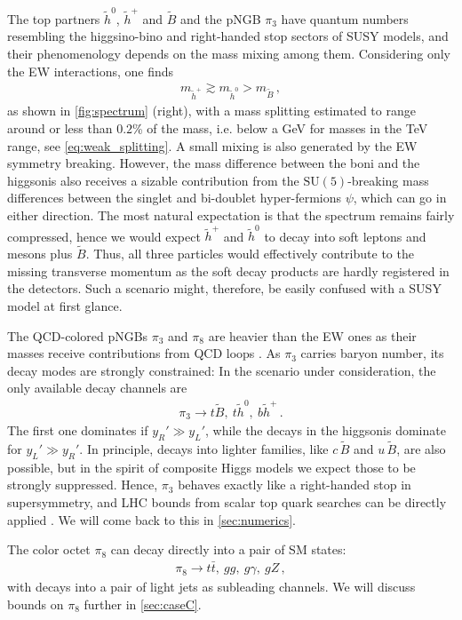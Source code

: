 \documentclass[preprintnumbers,nofootinbib,showpacs,eqsecnum,pre,12pt]{revtex4-1}
\newcommand{\SU}{\text{SU}}
\begin{document}
The top partners $\tilde h^0$, $\tilde h^+$ and $\tilde B$ and the pNGB $\pi_3$ have quantum numbers resembling the higgsino-bino and right-handed stop sectors of SUSY models, and their phenomenology depends on the mass mixing among them.
Considering only the EW interactions, one finds
\begin{align}
m_{\tilde h^+} \gtrsim m_{\tilde h^0} >  m_{\tilde B}\,, 
\end{align}
as shown in \cref{fig:spectrum} (right), with a mass splitting estimated to range around or less than $0.2$\% of the mass, i.e. below a GeV for masses in the TeV range, see \cref{eq:weak_splitting}.  A small mixing is also generated by the EW symmetry breaking. However, the mass difference between the boni and the higgsonis also receives a sizable contribution from the $\SU(5)$-breaking mass differences between the singlet and bi-doublet hyper-fermions $\psi$, which can go in either direction. The most natural expectation is that the spectrum remains fairly compressed, hence
we would expect $\tilde h^+$ and $\tilde h^0$ to decay into soft leptons and mesons plus $\tilde B$.
Thus, all three particles would effectively contribute to the missing transverse momentum as
the soft decay products are hardly registered in the detectors. Such a scenario
might, therefore, be easily confused with a SUSY model at first glance. 

The QCD-colored pNGBs $\pi_3$ and $\pi_8$ are heavier than the EW ones as their masses receive contributions from QCD loops \cite{Cacciapaglia:2015eqa}. As $\pi_3$ carries baryon number, its decay modes are strongly constrained: In the scenario under consideration, the only available decay channels are
\begin{align} \label{eq:pi3decayA}
\pi_3 \to t  \tilde B,\ t \tilde{h}^0,\ b \tilde{h}^+\,.
\end{align}
The first one dominates if $y_R' \gg y_L'$, while the decays in the higgsonis dominate for $y_L' \gg y_R'$.
In principle, decays into lighter families, like $c \, \tilde B$ and $u \, \tilde B$, are also possible, but in the spirit of composite Higgs models we expect those to be strongly suppressed. Hence, $\pi_3$ behaves exactly like a right-handed stop in supersymmetry, and LHC bounds from scalar top quark searches can be directly applied \cite{CMS:2019zmd,ATLAS:2020xzu,CMS:2021eha}. We will come back to this in \cref{sec:numerics}.

The color octet $\pi_8$ can decay directly into a pair of SM states:
\begin{align} \label{eq:pi8decays}
    \pi_8 \to t\bar{t},\ gg,\ g\gamma,\ gZ\,,
\end{align}
with decays into a pair of light jets as subleading channels. We will discuss bounds on $\pi_8$ further in \cref{sec:caseC}.  
\end{document}

